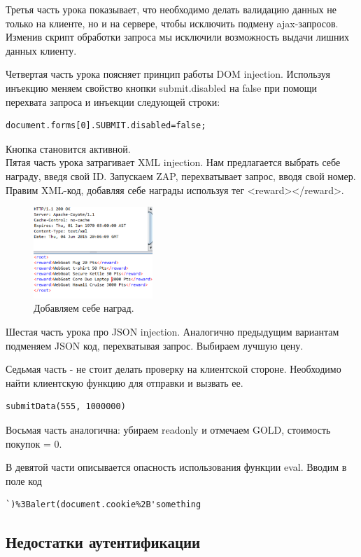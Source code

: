 \documentclass[a4paper, 14pt]{article}				%
\begin{document}
Третья часть урока показывает, что необходимо делать валидацию данных не только на клиенте, но и на сервере, чтобы исключить подмену ajax-запросов. Изменив скрипт обработки запроса мы исключили возможность выдачи лишних данных клиенту.

Четвертая часть урока поясняет принцип работы DOM injection. Используя инъекцию меняем свойство кнопки submit.disabled на false при помощи перехвата запроса и инъекции следующей строки:
\begin{Verbatim}[frame=single]
document.forms[0].SUBMIT.disabled=false;
\end{Verbatim}
Кнопка становится активной.\\

Пятая часть урока затрагивает XML injection. Нам предлагается выбрать себе награду, введя свой ID. Запускаем ZAP, перехватывает запрос, вводя свой номер. Правим XML-код, добавляя себе награды используя тег <reward></reward>.
\begin{figure}[h!]
\centering
\includegraphics[width=0.4\textwidth]{rsrc/5_1}
\caption{Добавляем себе наград.}
\end{figure}

\newpage
Шестая часть урока про JSON injection. Аналогично предыдущим вариантам подменяем JSON код, перехватывая запрос. Выбираем лучшую цену.

Седьмая часть - не стоит делать проверку на клиентской стороне. Необходимо найти клиентскую функцию для отправки и вызвать ее.
\begin{Verbatim}[frame=single]
submitData(555, 1000000)
\end{Verbatim}

Восьмая часть аналогична: убираем readonly и отмечаем GOLD, стоимость покупок = 0.

В девятой части описывается опасность использования функции eval. Вводим в поле код
\begin{Verbatim}[frame=single]
`)%3Balert(document.cookie%2B'something
\end{Verbatim}

\subsection{Недостатки аутентификации}
\end{document}

